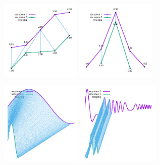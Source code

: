 \documentclass[12pt]{article}
\begin{document}
\begin{figure}[h]
    \centering
    \includegraphics[width=0.34\textwidth, height=0.34\textwidth]{tests/simple}
    \includegraphics[width=0.34\textwidth, height=0.34\textwidth]{tests/unequal}
\end{figure}

\begin{figure}[h]
    \centering
    \includegraphics[width=0.35\textwidth, height=0.35\textwidth]{tests/sin}
    \includegraphics[width=0.35\textwidth, height=0.35\textwidth]{tests/cont}
\end{figure}
\end{document}
